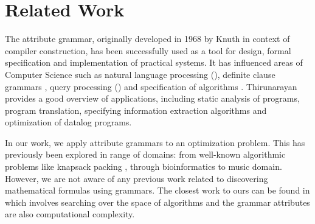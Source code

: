 \vspace{-2mm}
\section{Related Work} \label{relatedwork}
\vspace{-2mm}

The attribute grammar, originally developed in 1968 by Knuth \cite{knuth1968semantics} in context of compiler
construction, has been successfully used as a tool for design, formal specification
and implementation of practical systems. It has influenced areas of
Computer Science such as natural language processing (\citealp{hafiz2011modular, starkie2002inferring}), 
definite clause grammars \cite{bratko2001prolog}, query processing (\citealp{koch2007attribute,ramakrishnan1991top}) and specification of algorithms \cite{bellanova1984examples}.
Thirunarayan \cite{thirunarayan2009attribute} provides a good overview of 
applications, including static analysis of programs, program translation, specifying information
extraction algorithms and optimization of datalog programs.

In our work, we apply attribute grammars to an optimization problem. This has previously been explored in range of domains: from well-known algorithmic problems 
like knapsack packing \cite{o2004solving}, through bioinformatics \cite{waldispuhl2002approximate} to music domain\cite{desainte1994using}.
However, we are not aware of any previous work related to discovering mathematical formulas using grammars. The closest work to ours can be found in \cite{cheung1999attribute} which involves searching
over the space of algorithms and the grammar attributes are also computational complexity.



